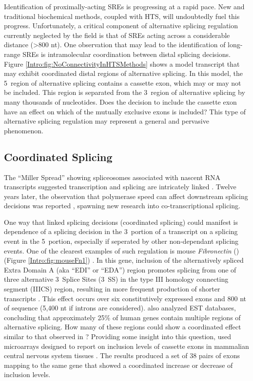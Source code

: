     Identification of proximally-acting SREs is progressing at a rapid pace. New and traditional biochemical methods, coupled with HTS, will undoubtedly fuel this progress. Unfortunately, a critical component of alternative splicing regulation currently neglected by the field is that of SREs acting across a considerable distance (>800 nt). One observation that may lead to the identification of long-range SREs is intramolecular coordination between distal splicing decisions. Figure \ref{Intro:fig:NoConnectivityInHTSMethods} shows a model transcript that may exhibit coordinated distal regions of alternative splicing. In this model, the 5\textprime~region of alternative splicing contains a cassette exon, which may or may not be included. This region is separated from the 3\textprime~region of alternative splicing by many thousands of nucleotides. Does the decision to include the cassette exon have an effect on which of the mutually exclusive exons is included? This type of alternative splicing regulation may represent a general and pervasive phenomenon.

  \subsection{Coordinated Splicing}
    \label{Intro:subsec:Coordination in splicing}

    The ``Miller Spread'' showing spliceosomes associated with nascent RNA transcripts suggested transcription and splicing are intricately linked \citep{Osheim1985}. Twelve years later, the observation that polymerase speed can affect downstream splicing decisions was reported \citep{Cramer1997}, spawning new research into co-transcriptional splicing.

    One way that linked splicing decisions (coordinated splicing) could manifest is dependence of a splicing decision in the 3\textprime~portion of a transcript on a splicing event in the 5\textprime~portion, especially if seperated by other non-dependant splicing events. One of the clearest examples of such regulation is mouse \textit{Fibronectin} (\fn{}) (Figure \ref{Intro:fig:mouseFn1}) \citep{Schwarzbauer1983, White2011a}. In this gene, inclusion of the alternatively spliced Extra Domain A (aka ``EDI'' or ``EDA'') region promotes splicing from one of three alternative 3\textprime~Splice Sites (3\textprime~SS) in the type III homology connecting segment (IIICS) region, resulting in more frequent production of shorter transcripts \citep{Fededa2005}. This effect occurs over six constitutively expressed exons and 800 nt of sequence (5,400 nt if introns are considered). \citet{Fededa2005} also analyzed EST databases, concluding that approximately 25\% of human genes contain multiple regions of alternative splicing. How many of these regions could show a coordinated effect similar to that observed in \fn{}? Providing some insight into this question, \citep{Fagnani2007} used microarrays designed to report on inclusion levels of cassette exons in mammalian central nervous system tissues \citep{Fagnani2007}. The results produced a set of 38 pairs of exons mapping to the same gene that showed a coordinated increase or decrease of inclusion levels.

